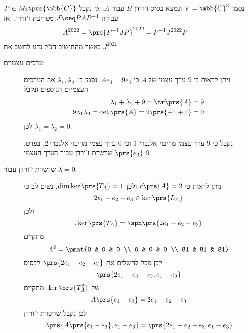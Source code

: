 \documentclass[a4paper,10pt,twoside,openany]{book}
\begin{document}
\begin{solution}
נסמן
$V = \mbb{C}^3$
ונמצא בסיס ז'ורדן
$B$
עבור
$A$.
אז נקבל
$P \in M_3\prs{\mbb{C}}$
עבורה
$J \ceq P A P^{-1}$
מטריצת ז'ורדן, ואז
\begin{align*}
A^{2022} &= \prs{P^{-1}JP}^{2022}
= P^{-1}J^{2022}P
\end{align*}
כאשר מהחישוב הנ"ל נדע לחשב את
$J^{2022}$.

\begin{description}
\item[ערכים עצמיים:]
ניתן לראות כי
$9$
ערך עצמי של
$A$
כי
$A e_3 = 9 e_3$.
נסמן ב־%
$\lambda_1, \lambda_2$
את הערכים העצמיים הנוספים ונקבל
\begin{align*}
\lambda_1 + \lambda_2 + 9 = \tr\prs{A} = 9 \\
9 \lambda_1 \lambda_2 = \det\prs{A} = 9\prs{-4+4} = 0
\end{align*}
לכן
$\lambda_1 = \lambda_2 = 0$.

נקבל כי
$9$
ערך עצמי מריבוי אלגברי
$1$
וכי
$0$
ערך עצמי מריבוי אלגברי
$2$.
בפרט,
$\prs{e_3}$
שרשרת ז'ורדן עבור הערך העצמי
$9$.
\item[שרשרת ז'ורדן עבור
$\lambda = 0$:]
ניתן לראות כי
$r\prs{A} = 2$
ולכן
$\dim \ker \prs{T_A} = 1$.
נשים לב כי
\[2 e_1 - e_2 - e_3 \in \ker\prs{L_A}\]
ולכן
\[\text{.} \ker\prs{T_A} = \spn\prs{2 e_1 - e_2 - e_3}\]
מתקיים
\[A^2 = \pmat{0 & 0 & 0 \\ 0 & 0 & 0 \\ 81 & 81 & 81}\]
לכן נוכל להשלים את
$\prs{2 e_1 - e_2 - e_3}$
לבסיס
\[\prs{2 e_1 - e_2 - e_3, e_1 - e_3}\]
של
$\ker\prs{T_A^2}$.
מתקיים
\[A \prs{e_1 - e_3} = 2e_1 - e_2 - e_3\]
לכן נקבל שרשרת ז'ורדן
\[\text{.} \prs{A\prs{e_1 - e_3}, e_1 - e_3} = \prs{2e_1 - e_2 - e_3, e_1 - e_3}\]


\end{description}
\end{solution}
\end{document}
